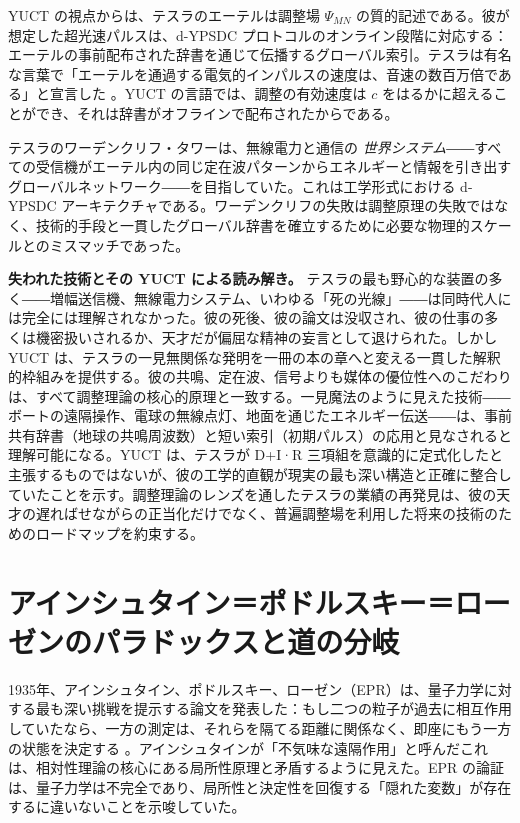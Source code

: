 \documentclass[12pt,a4paper]{article}
\begin{document}
	YUCT の視点からは、テスラのエーテルは調整場 \(\Psi_{MN}\) の質的記述である。彼が想定した超光速パルスは、d-YPSDC プロトコルのオンライン段階に対応する：エーテルの事前配布された辞書を通じて伝播するグローバル索引。テスラは有名な言葉で「エーテルを通過する電気的インパルスの速度は、音速の数百万倍である」と宣言した \cite{Tesla1907}。YUCT の言語では、調整の有効速度は \(c\) をはるかに超えることができ、それは辞書がオフラインで配布されたからである。
	
	テスラのワーデンクリフ・タワーは、無線電力と通信の \emph{世界システム}――すべての受信機がエーテル内の同じ定在波パターンからエネルギーと情報を引き出すグローバルネットワーク――を目指していた。これは工学形式における d-YPSDC アーキテクチャである。ワーデンクリフの失敗は調整原理の失敗ではなく、技術的手段と一貫したグローバル辞書を確立するために必要な物理的スケールとのミスマッチであった。
	
	\textbf{失われた技術とその YUCT による読み解き。} テスラの最も野心的な装置の多く――増幅送信機、無線電力システム、いわゆる「死の光線」――は同時代人には完全には理解されなかった。彼の死後、彼の論文は没収され、彼の仕事の多くは機密扱いされるか、天才だが偏屈な精神の妄言として退けられた。しかし YUCT は、テスラの一見無関係な発明を一冊の本の章へと変える一貫した解釈的枠組みを提供する。彼の共鳴、定在波、信号よりも媒体の優位性へのこだわりは、すべて調整理論の核心的原理と一致する。一見魔法のように見えた技術――ボートの遠隔操作、電球の無線点灯、地面を通じたエネルギー伝送――は、事前共有辞書（地球の共鳴周波数）と短い索引（初期パルス）の応用と見なされると理解可能になる。YUCT は、テスラが D+I·R 三項組を意識的に定式化したと主張するものではないが、彼の工学的直観が現実の最も深い構造と正確に整合していたことを示す。調整理論のレンズを通したテスラの業績の再発見は、彼の天才の遅ればせながらの正当化だけでなく、普遍調整場を利用した将来の技術のためのロードマップを約束する。
	
	\section{アインシュタイン＝ポドルスキー＝ローゼンのパラドックスと道の分岐}
	
	1935年、アインシュタイン、ポドルスキー、ローゼン（EPR）は、量子力学に対する最も深い挑戦を提示する論文を発表した：もし二つの粒子が過去に相互作用していたなら、一方の測定は、それらを隔てる距離に関係なく、即座にもう一方の状態を決定する \cite{EPR1935}。アインシュタインが「不気味な遠隔作用」と呼んだこれは、相対性理論の核心にある局所性原理と矛盾するように見えた。EPR の論証は、量子力学は不完全であり、局所性と決定性を回復する「隠れた変数」が存在するに違いないことを示唆していた。
	
\end{document}
